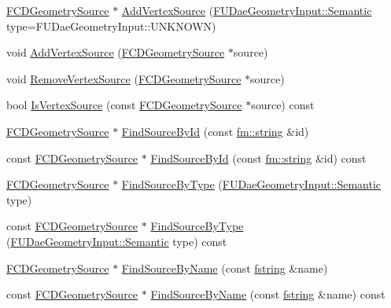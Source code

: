 \begin{DoxyCompactItemize}
\item 
\hyperlink{classFCDGeometrySource}{FCDGeometrySource} $\ast$ \hyperlink{classFCDGeometryMesh_a0f44d1225024898096c94c404735f002}{AddVertexSource} (\hyperlink{namespaceFUDaeGeometryInput_a0f887d29f54b10338ebcf73789a7a061}{FUDaeGeometryInput::Semantic} type=FUDaeGeometryInput::UNKNOWN)
\item 
void \hyperlink{classFCDGeometryMesh_a876590d1949d84b329bce4b7c4f1b156}{AddVertexSource} (\hyperlink{classFCDGeometrySource}{FCDGeometrySource} $\ast$source)
\item 
void \hyperlink{classFCDGeometryMesh_ac9588d9fbce6033d50081a5548d8a750}{RemoveVertexSource} (\hyperlink{classFCDGeometrySource}{FCDGeometrySource} $\ast$source)
\item 
bool \hyperlink{classFCDGeometryMesh_a3ed75ea7669024342ae73557fa6d685f}{IsVertexSource} (const \hyperlink{classFCDGeometrySource}{FCDGeometrySource} $\ast$source) const 
\item 
\hyperlink{classFCDGeometrySource}{FCDGeometrySource} $\ast$ \hyperlink{classFCDGeometryMesh_a1a495f5f00098b395600395642537cfa}{FindSourceById} (const \hyperlink{classfm_1_1stringT}{fm::string} \&id)
\item 
const \hyperlink{classFCDGeometrySource}{FCDGeometrySource} $\ast$ \hyperlink{classFCDGeometryMesh_a923d2f84ba37ad337f3262cb7df2e46d}{FindSourceById} (const \hyperlink{classfm_1_1stringT}{fm::string} \&id) const 
\item 
\hyperlink{classFCDGeometrySource}{FCDGeometrySource} $\ast$ \hyperlink{classFCDGeometryMesh_a3788f726e849de30ffef93ba90583700}{FindSourceByType} (\hyperlink{namespaceFUDaeGeometryInput_a0f887d29f54b10338ebcf73789a7a061}{FUDaeGeometryInput::Semantic} type)
\item 
const \hyperlink{classFCDGeometrySource}{FCDGeometrySource} $\ast$ \hyperlink{classFCDGeometryMesh_afeacc64105ee1ead0b3af7f854416ad0}{FindSourceByType} (\hyperlink{namespaceFUDaeGeometryInput_a0f887d29f54b10338ebcf73789a7a061}{FUDaeGeometryInput::Semantic} type) const 
\item 
\hyperlink{classFCDGeometrySource}{FCDGeometrySource} $\ast$ \hyperlink{classFCDGeometryMesh_a584960c00a400af53f293eedfc6240a6}{FindSourceByName} (const \hyperlink{classfm_1_1stringT}{fstring} \&name)
\item 
const \hyperlink{classFCDGeometrySource}{FCDGeometrySource} $\ast$ \hyperlink{classFCDGeometryMesh_ad4dcd04e32a8c8919170d162e9fc8277}{FindSourceByName} (const \hyperlink{classfm_1_1stringT}{fstring} \&name) const 
\item 

\end{DoxyCompactItemize}
